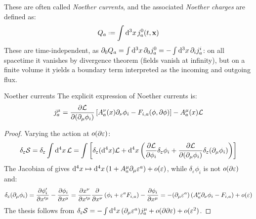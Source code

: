 These are often called \textit{Noether currents}, and the associated \textit{Noether charges} are defined as:
\begin{equation}
  Q_a \defeq \int \dd^3 x\, j^0_a(t,\ve{x})
\end{equation}
These are time-independent, as $ \partial_0 Q_a = \int \mathrm{d}^3 x\, \partial_0 j^0_a = - \int \mathrm{d}^3 x\, \partial_i j^i_a $: on all spacetime it vanishes by divergence theorem (fields vanish at infinity), but on a finite volume it yields a boundary term interpreted as the incoming and outgoing flux.

\begin{proposition}{Noether currents}{}
  The explicit expression of Noether currents is:
  \begin{equation}
    j^\mu_a = \frac{\partial \mathcal{L}}{\partial (\partial_\mu \phi_i)} \left[ A^\nu_a(x) \partial_\nu \phi_i - F_{i,a}(\phi, \partial \phi) \right] - A^\mu_a(x) \mathcal{L}
    \label{eq:noether-current}
  \end{equation}
\end{proposition}

\begin{proofbox}
  \begin{proof}
    Varying the action at $ o(\partial \varepsilon) $:
    \begin{equation*}
        \delta_\varepsilon \mathcal{S} = \delta_\varepsilon \int \mathrm{d}^4 x\, \mathcal{L} = \int \left[ \delta_\varepsilon (\mathrm{d}^4 x) \mathcal{L} + \mathrm{d}^4 x \left( \frac{\partial \mathcal{L}}{\partial \phi_i} \delta_\varepsilon \phi_i + \frac{\partial \mathcal{L}}{\partial (\partial_\mu \phi_i)} \delta_\varepsilon (\partial_\mu \phi_i) \right) \right]
    \end{equation*}
    The Jacobian of  gives $ \mathrm{d}^4 x \mapsto \mathrm{d}^4 x \left( 1 + A^\mu_a \partial_\mu \varepsilon^a \right) + o(\varepsilon) $, while $ \delta_\varepsilon \phi_i $ is not $ o(\partial \varepsilon) $ and:
    \begin{equation*}
      \delta_\varepsilon (\partial_\mu \phi_i) = \frac{\partial \phi'_i}{\partial x'^\mu} - \frac{\partial \phi_i}{\partial x^\mu} = \frac{\partial x^\nu}{\partial x'^\mu} \frac{\partial}{\partial x^\nu} \left( \phi_i + \varepsilon^a F_{i,a} \right) - \frac{\partial \phi_i}{\partial x^\mu} = - (\partial_\mu \varepsilon^a) \left( A^\nu_a \partial_\nu \phi_i - F_{i,a} \right) + o(\varepsilon)
    \end{equation*}
    The thesis follows from $ \delta_\varepsilon \mathcal{S} = - \int \mathrm{d}^4 x\, (\partial_\mu \varepsilon^a) j^\mu_a + o(\partial \partial \varepsilon) + o(\varepsilon^2) $.
  \end{proof}
\end{proofbox}


